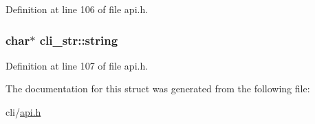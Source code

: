 Definition at line 106 of file api.h.

\hypertarget{structcli__str_a5897bbe3811d29e388c8edd2c0007387}{
\subsubsection[{string}]{\setlength{\rightskip}{0pt plus 5cm}char$\ast$ {\bf cli\_\-str::string}}}
\label{structcli__str_a5897bbe3811d29e388c8edd2c0007387}


Definition at line 107 of file api.h.



The documentation for this struct was generated from the following file:\begin{DoxyCompactItemize}
\item 
cli/\hyperlink{api_8h}{api.h}\end{DoxyCompactItemize}
